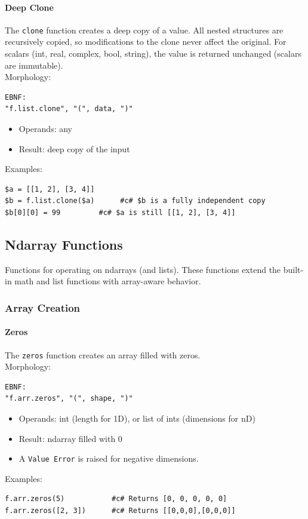 \paragraph{Deep Clone}
The \texttt{clone} function creates a deep copy of a value. All nested structures are recursively copied, so modifications to the clone never affect the original. For scalars (int, real, complex, bool, string), the value is returned unchanged (scalars are immutable).\\
Morphology:
\begin{verbatim}
EBNF:
"f.list.clone", "(", data, ")"
\end{verbatim}
\begin{itemize}
\item Operands: any
\item Result: deep copy of the input
\end{itemize}
Examples:
\begin{verbatim}
$a = [[1, 2], [3, 4]]
$b = f.list.clone($a)      #c# $b is a fully independent copy
$b[0][0] = 99         #c# $a is still [[1, 2], [3, 4]]
\end{verbatim}

\subsection{Ndarray Functions}
Functions for operating on ndarrays (and lists). These functions extend the built-in math and list functions with array-aware behavior.

\subsubsection{Array Creation}

\paragraph{Zeros}
The \texttt{zeros} function creates an array filled with zeros.\\
Morphology:
\begin{verbatim}
EBNF:
"f.arr.zeros", "(", shape, ")"
\end{verbatim}
\begin{itemize}
\item Operands: int (length for 1D), or list of ints (dimensions for nD)
\item Result: ndarray filled with 0
\item A \texttt{Value Error} is raised for negative dimensions.
\end{itemize}
Examples:
\begin{verbatim}
f.arr.zeros(5)           #c# Returns [0, 0, 0, 0, 0]
f.arr.zeros([2, 3])      #c# Returns [[0,0,0],[0,0,0]]
\end{verbatim}

